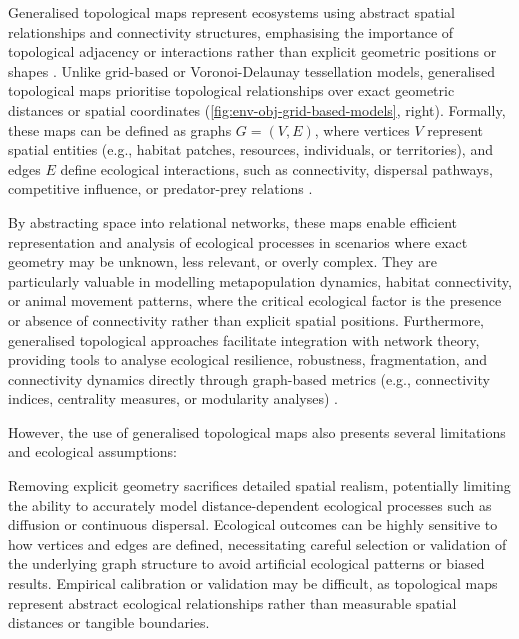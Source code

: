 Generalised topological maps represent ecosystems using abstract spatial relationships and connectivity structures, emphasising the importance of topological adjacency or interactions rather than explicit geometric positions or shapes \cite{Urban2009}. Unlike grid-based or Voronoi-Delaunay tessellation models, generalised topological maps prioritise topological relationships over exact geometric distances or spatial coordinates (\cref{fig:env-obj-grid-based-models}, right). Formally, these maps can be defined as graphs $G = (V, E)$, where vertices $V$ represent spatial entities (e.g., habitat patches, resources, individuals, or territories), and edges $E$ define ecological interactions, such as connectivity, dispersal pathways, competitive influence, or predator-prey relations \cite{Hamonic2021,Minor2008,Peterson2024}.

By abstracting space into relational networks, these maps enable efficient representation and analysis of ecological processes in scenarios where exact geometry may be unknown, less relevant, or overly complex. They are particularly valuable in modelling metapopulation dynamics, habitat connectivity, or animal movement patterns, where the critical ecological factor is the presence or absence of connectivity rather than explicit spatial positions. Furthermore, generalised topological approaches facilitate integration with network theory, providing tools to analyse ecological resilience, robustness, fragmentation, and connectivity dynamics directly through graph-based metrics (e.g., connectivity indices, centrality measures, or modularity analyses) \cite{Lemiere2023,Gaucherel2012}.

However, the use of generalised topological maps also presents several limitations and ecological assumptions:
\begin{Itemize}
    \Item{} Removing explicit geometry sacrifices detailed spatial realism, potentially limiting the ability to accurately model distance-dependent ecological processes such as diffusion or continuous dispersal.
    \Item{} Ecological outcomes can be highly sensitive to how vertices and edges are defined, necessitating careful selection or validation of the underlying graph structure to avoid artificial ecological patterns or biased results.
    \Item{} Empirical calibration or validation may be difficult, as topological maps represent abstract ecological relationships rather than measurable spatial distances or tangible boundaries.
\end{Itemize}

